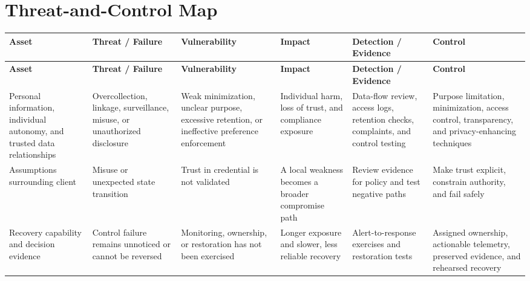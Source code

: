 \documentclass[11pt]{article}
\begin{document}
\section*{Threat-and-Control Map}
\begingroup\scriptsize\setlength{\tabcolsep}{2pt}
\begin{longtable}{>{\RaggedRight\arraybackslash}p{}>{\RaggedRight\arraybackslash}p{}>{\RaggedRight\arraybackslash}p{}>{\RaggedRight\arraybackslash}p{}>{\RaggedRight\arraybackslash}p{}>{\RaggedRight\arraybackslash}p{}}
\toprule\rowcolor{Navy}\color{white}\textbf{Asset} & \color{white}\textbf{Threat / Failure} & \color{white}\textbf{Vulnerability} & \color{white}\textbf{Impact} & \color{white}\textbf{Detection / Evidence} & \color{white}\textbf{Control}\\\midrule
\endfirsthead
\toprule\rowcolor{Navy}\color{white}\textbf{Asset} & \color{white}\textbf{Threat / Failure} & \color{white}\textbf{Vulnerability} & \color{white}\textbf{Impact} & \color{white}\textbf{Detection / Evidence} & \color{white}\textbf{Control}\\\midrule
\endhead
Personal information, individual autonomy, and trusted data relationships & Overcollection, linkage, surveillance, misuse, or unauthorized disclosure & Weak minimization, unclear purpose, excessive retention, or ineffective preference enforcement & Individual harm, loss of trust, and compliance exposure & Data-flow review, access logs, retention checks, complaints, and control testing & Purpose limitation, minimization, access control, transparency, and privacy-enhancing techniques\\\midrule
Assumptions surrounding client & Misuse or unexpected state transition & Trust in credential is not validated & A local weakness becomes a broader compromise path & Review evidence for policy and test negative paths & Make trust explicit, constrain authority, and fail safely\\\midrule
Recovery capability and decision evidence & Control failure remains unnoticed or cannot be reversed & Monitoring, ownership, or restoration has not been exercised & Longer exposure and slower, less reliable recovery & Alert-to-response exercises and restoration tests & Assigned ownership, actionable telemetry, preserved evidence, and rehearsed recovery\\\midrule
\bottomrule
\end{longtable}
\endgroup
\end{document}

